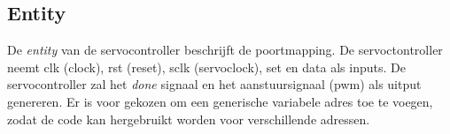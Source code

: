 \subsection{Entity}
De \textit{entity} van de servocontroller beschrijft de poortmapping. De servoctontroller neemt clk (clock), rst (reset), sclk (servoclock), set en data als inputs. De servocontroller zal het \textit{done} signaal en het aanstuursignaal (pwm) als uitput genereren. Er is voor gekozen om een generische variabele adres toe te voegen, zodat de code kan hergebruikt worden voor verschillende adressen.
